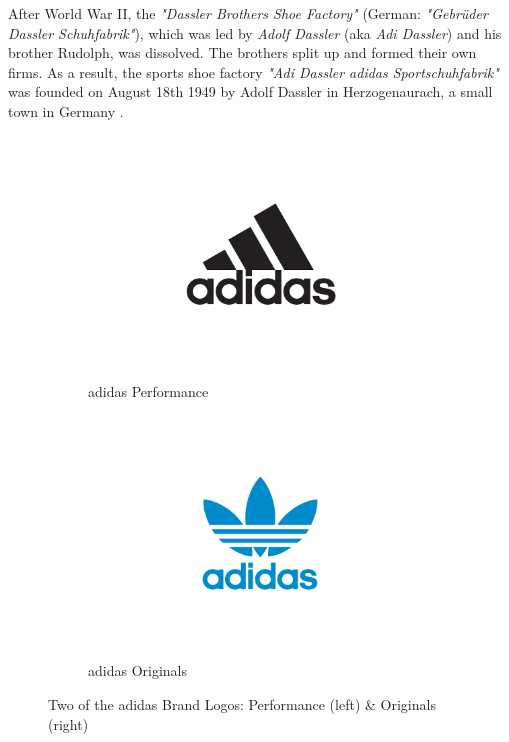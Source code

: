 

After World War II, the \textit{"Dassler Brothers Shoe Factory"} (German: \textit{"Gebrüder Dassler Schuhfabrik"}), which was led by \textit{Adolf Dassler} (aka \textit{Adi Dassler}) and his brother Rudolph, was dissolved. The brothers split up and formed their own firms. As a result, the sports shoe factory \textit{"Adi Dassler adidas Sportschuhfabrik"} was founded on August 18th 1949 by Adolf Dassler in Herzogenaurach, a small town in Germany \citep{adidas-group}.

\begin{figure}[H]
\centering
\begin{subfigure}{.4\textwidth}
  \centering
  \includegraphics[width=\linewidth]{figures/adidas_performance_logo.jpg}
  \caption{adidas Performance}
  \label{fig:adidas_performance_logo}
\end{subfigure}
\begin{subfigure}{.4\textwidth}
  \centering
  \includegraphics[width=\linewidth]{figures/adidas_originals_logo.jpg}
  \caption{adidas Originals}
  \label{fig:adidas_originals_logo}
\end{subfigure}
\caption{Two of the adidas Brand Logos: Performance (left) \& Originals (right) \\ \citep{adidasmediacenter}}
\label{fig:adidas_logos}
\end{figure}


